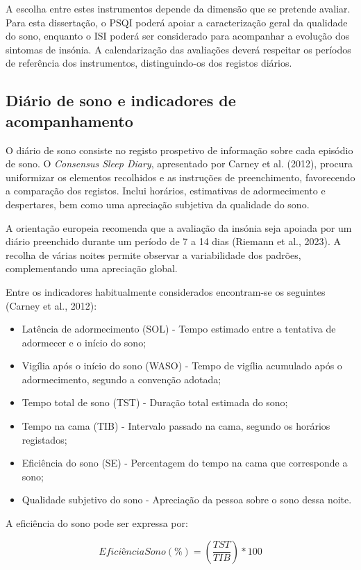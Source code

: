 A escolha entre estes instrumentos depende da dimensão que se pretende avaliar. Para esta dissertação, o PSQI poderá apoiar a caracterização geral da qualidade do sono, enquanto o ISI poderá ser considerado para acompanhar a evolução dos sintomas de insónia. A calendarização das avaliações deverá respeitar os períodos de referência dos instrumentos, distinguindo-os dos registos diários.

\subsection{Diário de sono e indicadores de acompanhamento}
\label{sec:chap2_diarioSono}

O diário de sono consiste no registo prospetivo de informação sobre cada episódio de sono. O \textit{Consensus Sleep Diary}, apresentado por Carney et al. (2012), procura uniformizar os elementos recolhidos e as instruções de preenchimento, favorecendo a comparação dos registos. Inclui horários, estimativas de adormecimento e despertares, bem como uma apreciação subjetiva da qualidade do sono.

A orientação europeia recomenda que a avaliação da insónia seja apoiada por um diário preenchido durante um período de 7 a 14 dias (Riemann et al., 2023). A recolha de várias noites permite observar a variabilidade dos padrões, complementando uma apreciação global.

Entre os indicadores habitualmente considerados encontram-se os seguintes (Carney et al., 2012):
\begin{itemize}
	\item Latência de adormecimento (SOL) - Tempo estimado entre a tentativa de adormecer e o início do sono;
	\item Vigília após o início do sono (WASO) - Tempo de vigília acumulado após o adormecimento, segundo a convenção adotada;
	\item Tempo total de sono (TST) - Duração total estimada do sono;
	\item Tempo na cama (TIB) - Intervalo passado na cama, segundo os horários registados;
	\item Eficiência do sono (SE) - Percentagem do tempo na cama que corresponde a sono;
	\item Qualidade subjetivo do sono - Apreciação da pessoa sobre o sono dessa noite.
\end{itemize}

A eficiência do sono pode ser expressa por:

\[EficiênciaSono (\%) = (\frac{TST}{TIB}) * 100\]

